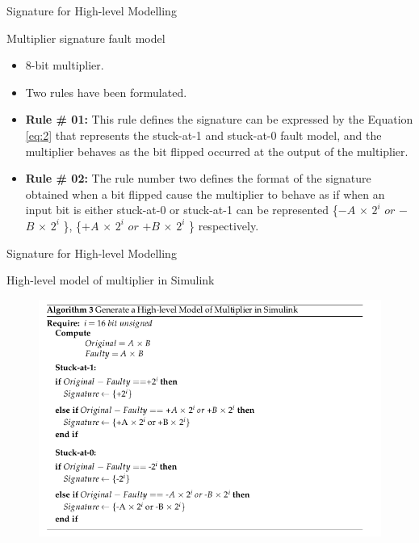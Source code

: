 \documentclass[aspectratio=1610]{beamer}
\newcommand{\semitransp}[2][35]{\color{fg!#1}#2}
\begin{document}
\begin{frame}{Signature for High-level Modelling}

\begin{block}{Multiplier signature fault model}
\end{block}
\begin{itemize}
\item 8-bit multiplier.
\item Two rules have been formulated.

\item \textbf{Rule \# 01:} This rule defines the signature can be expressed by the Equation \ref{eq:2} that represents the stuck-at-1 and stuck-at-0 fault model, and the multiplier behaves as the bit flipped occurred at the output of the multiplier.  \\
\item \textbf{Rule \# 02:} The rule number two defines the format of the signature obtained when a bit flipped cause the multiplier to behave as if when an input bit is either stuck-at-0 or stuck-at-1 can be represented \{$-$$A$ $\times$ $2^{i}$ $or$  $-$$B$ $\times$ $2^{i}$ \}, \{$+$$A$ $\times$ $2^{i}$ $or$  $+$$B$ $\times$ $2^{i}$ \} respectively. 

\end{itemize}

\end{frame}

\begin{frame}{Signature for High-level Modelling}

\begin{block}{High-level model of multiplier in Simulink}
\end{block}



\begin{figure}[tb!]
 \centering
  \captionsetup{justification=centering}    
   \includegraphics[scale=0.35]{Figures/algo-3.png}
   

\end{figure}



\end{frame}
\end{document}
